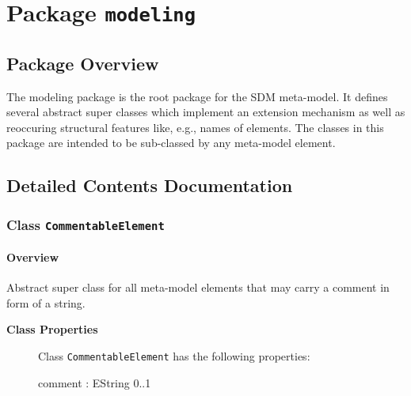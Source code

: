 \section{Package \bfseries \texttt{modeling}\normalfont}
\subsection{Package Overview}
	
			
The modeling package is the root package for the SDM meta-model. It defines several abstract super classes which implement an extension mechanism as well as reoccuring structural features like, e.g., names of elements. The classes in this package are intended to be sub-classed by any meta-model element.	
		
	
			
		



\subsection{Detailed Contents Documentation}
\subsubsection{\Large{Class \bfseries \texttt{CommentableElement}\normalfont}}
\label{cls:modeling::CommentableElement} 
\paragraph{Overview}

	
			
Abstract super class for all meta-model elements that may carry a comment in form of a string.	
		
	


\begin{description}

	\item[\textbf{Class Properties}] Class \texttt{CommentableElement} has the following properties:
	\begin{description}
\item[comment : EString 			0..1]
\hspace{\fill}
\nopagebreak


	
	\end{description}
	
	

\end{description}

